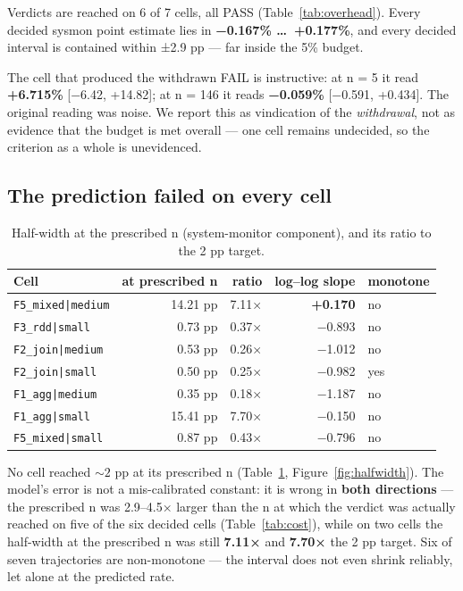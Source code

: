 \documentclass[sigconf,review,anonymous]{acmart}
\newcommand{\cell}[1]{\texttt{#1}}
\begin{document}
Verdicts are reached on 6 of 7 cells, all PASS (Table~\ref{tab:overhead}). Every decided sysmon point
estimate lies in \textbf{−0.167\% \ldots\ +0.177\%}, and every decided interval is contained within
±2.9 pp --- far inside the 5\% budget.

The cell that produced the withdrawn FAIL is instructive: at n = 5 it read \textbf{+6.715\%}
[−6.42, +14.82]; at n = 146 it reads \textbf{−0.059\%} [−0.591, +0.434]. The original reading was
noise. We report this as vindication of the \emph{withdrawal}, not as evidence that the budget is met
overall --- one cell remains undecided, so the criterion as a whole is unevidenced.

\subsection{The prediction failed on every cell}\label{sec:failed}

\begin{table}[t]
\caption{Half-width at the prescribed n (system-monitor component), and its ratio to the 2 pp target.}\label{tab:prediction}
\small
\setlength{\tabcolsep}{3pt}
\begin{tabular}{lrrrl}
\toprule
Cell & at prescribed n & ratio & log--log slope & monotone \\
\midrule
\cell{F5\_mixed|medium} & 14.21 pp & 7.11× & \textbf{+0.170} & no \\
\cell{F3\_rdd|small} & 0.73 pp & 0.37× & −0.893 & no \\
\cell{F2\_join|medium} & 0.53 pp & 0.26× & −1.012 & no \\
\cell{F2\_join|small} & 0.50 pp & 0.25× & −0.982 & yes \\
\cell{F1\_agg|medium} & 0.35 pp & 0.18× & −1.187 & no \\
\cell{F1\_agg|small} & 15.41 pp & 7.70× & −0.150 & no \\
\cell{F5\_mixed|small} & 0.87 pp & 0.43× & −0.796 & no \\
\bottomrule
\end{tabular}
\end{table}

No cell reached ${\sim}2$ pp at its prescribed n (Table~\ref{tab:prediction},
Figure~\ref{fig:halfwidth}). The model's error is not a mis-calibrated constant: it is wrong in
\textbf{both directions} --- the prescribed n was 2.9--4.5× larger than the n at which the verdict was
actually reached on five of the six decided cells (Table~\ref{tab:cost}), while on two cells the
half-width at the prescribed n was still \textbf{7.11×} and \textbf{7.70×} the 2 pp target. Six of
seven trajectories are non-monotone --- the interval does not even shrink reliably, let alone at the
predicted rate.
\end{document}
